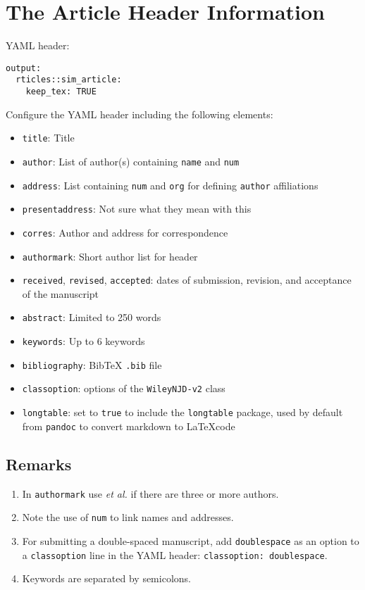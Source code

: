 \documentclass[AMA,STIX1COL,]{WileyNJD-v2}
\begin{document}
\hypertarget{the-article-header-information}{%
\section{The Article Header
Information}\label{the-article-header-information}}

YAML header:

\begin{verbatim}
output:
  rticles::sim_article:
    keep_tex: TRUE
\end{verbatim}

Configure the YAML header including the following elements:

\begin{itemize}
\item
  \texttt{title}: Title
\item
  \texttt{author}: List of author(s) containing \texttt{name} and
  \texttt{num}
\item
  \texttt{address}: List containing \texttt{num} and \texttt{org} for
  defining \texttt{author} affiliations
\item
  \texttt{presentaddress}: Not sure what they mean with this
\item
  \texttt{corres}: Author and address for correspondence
\item
  \texttt{authormark}: Short author list for header
\item
  \texttt{received}, \texttt{revised}, \texttt{accepted}: dates of
  submission, revision, and acceptance of the manuscript
\item
  \texttt{abstract}: Limited to 250 words
\item
  \texttt{keywords}: Up to 6 keywords
\item
  \texttt{bibliography}: BibTeX \texttt{.bib} file
\item
  \texttt{classoption}: options of the \texttt{WileyNJD-v2} class
\item
  \texttt{longtable}: set to \texttt{true} to include the
  \texttt{longtable} package, used by default from \texttt{pandoc} to
  convert markdown to \LaTeX code
\end{itemize}

\hypertarget{remarks}{%
\subsection{Remarks}\label{remarks}}

\begin{enumerate}
\def\labelenumi{\arabic{enumi}.}
\item
  In \texttt{authormark} use \emph{et al.} if there are three or more
  authors.
\item
  Note the use of \texttt{num} to link names and addresses.
\item
  For submitting a double-spaced manuscript, add \texttt{doublespace} as
  an option to a \texttt{classoption} line in the YAML header:
  \texttt{classoption:\ doublespace}.
\item
  Keywords are separated by semicolons.
\end{enumerate}
\end{document}
